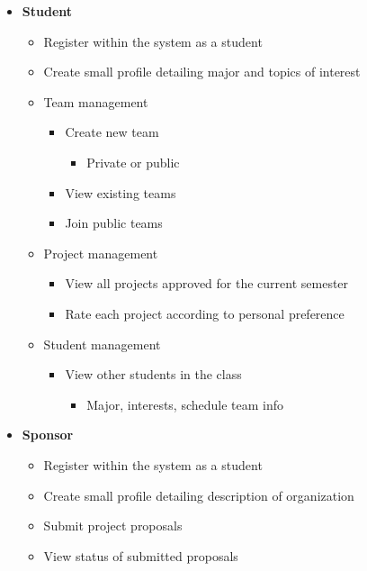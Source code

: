\documentclass[12pt]{article}
\begin{document}
\begin{itemize}
	\item \textbf{Student}
	\begin{itemize}
		\item Register within the system as a student
		\item Create small profile detailing major and topics of interest
		\item Team management
		\begin{itemize}
			\item Create new team
			\begin{itemize}
				\item Private or public
			\end{itemize}
			\item View existing teams
			\item Join public teams
		\end{itemize}
		\item Project management
		\begin{itemize}
			\item View all projects approved for the current semester
			\item Rate each project according to personal preference
		\end{itemize}
		\item Student management
		\begin{itemize}
			\item View other students in the class
			\begin{itemize}
				\item Major, interests, schedule team info
			\end{itemize}
		\end{itemize}
	\end{itemize}

	\item \textbf{Sponsor}
	\begin{itemize}
		\item Register within the system as a student
		\item Create small profile detailing description of organization
		\item Submit project proposals
		\item View status of submitted proposals
	\end{itemize}


\end{itemize}
\end{document}

